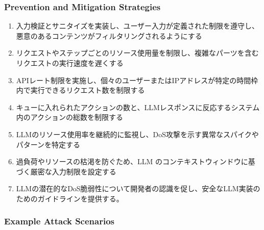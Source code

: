 \documentclass[
]{article}
\providecommand{\tightlist}{%
  \setlength{\itemsep}{0pt}\setlength{\parskip}{0pt}}
\begin{document}
\subsubsection{Prevention and Mitigation
Strategies}\label{prevention-and-mitigation-strategies}

\begin{enumerate}
\def\labelenumi{\arabic{enumi}.}
\tightlist
\item
  入力検証とサニタイズを実装し、ユーザー入力が定義された制限を遵守し、悪意のあるコンテンツがフィルタリングされるようにする
\item
  リクエストやステップごとのリソース使用量を制限し、複雑なパーツを含むリクエストの実行速度を遅くする
\item
  APIレート制限を実施し、個々のユーザーまたはIPアドレスが特定の時間枠内で実行できるリクエスト数を制限する
\item
  キューに入れられたアクションの数と、LLMレスポンスに反応するシステム内のアクションの総数を制限する
\item
  LLMのリソース使用率を継続的に監視し、DoS攻撃を示す異常なスパイクやパターンを特定する
\item
  過負荷やリソースの枯渇を防ぐため、LLM
  のコンテキストウィンドウに基づく厳密な入力制限を設定する
\item
  LLMの潜在的なDoS脆弱性について開発者の認識を促し、安全なLLM実装のためのガイドラインを提供する。
\end{enumerate}

\subsubsection{Example Attack Scenarios}\label{example-attack-scenarios}
\end{document}
